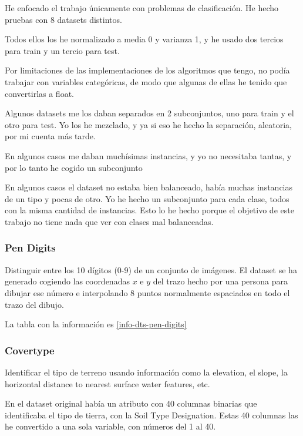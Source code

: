 He enfocado el trabajo únicamente con problemas de clasificación. He hecho
pruebas con 8 datasets distintos.

Todos ellos los he normalizado a media 0 y varianza 1, y he usado dos tercios
para train y un tercio para test.

Por limitaciones de las implementaciones de los algoritmos que tengo, no podía
trabajar con variables categóricas, de modo que algunas de ellas he tenido que
convertirlas a float.

Algunos datasets me los daban separados en 2 subconjuntos, uno para train y el
otro para test. Yo los he mezclado, y ya si eso he hecho la separación,
aleatoria, por mi cuenta más tarde.

En algunos casos me daban muchísimas instancias, y yo no necesitaba tantas, y
por lo tanto he cogido un subconjunto

En algunos casos el dataset no estaba bien balanceado, había muchas instancias
de un tipo y pocas de otro. Yo he hecho un subconjunto para cada clase, todos
con la misma cantidad de instancias. Esto lo he hecho porque el objetivo de este
trabajo no tiene nada que ver con clases mal balanceadas.

\subsubsection{Pen Digits}
\cite[See][]{pen-digits}

Distinguir entre los 10 dígitos (0-9) de un conjunto de imágenes. El dataset
se ha generado cogiendo las coordenadas $x$ e $y$ del trazo hecho por una
persona para dibujar ese número e interpolando 8 puntos normalmente espaciados
en todo el trazo del dibujo.

La tabla con la información es \ref{info-dts-pen-digits}


\subsubsection{Covertype}
\cite[See][]{covertype}

Identificar el tipo de terreno usando información como la elevation, el slope,
la horizontal distance to nearest surface water features, etc.

En el dataset original había un atributo con 40 columnas binarias que
identificaba el tipo de tierra, con la Soil Type Designation. Estas 40
columnas las he convertido a una sola variable, con números del 1 al 40.

